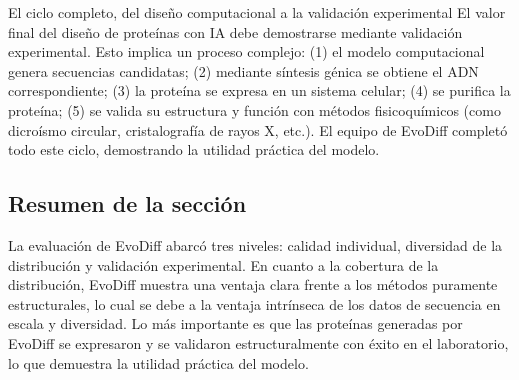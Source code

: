 \begin{knowledgebox}{El ciclo completo, del diseño computacional a la validación experimental}
El valor final del diseño de proteínas con IA debe demostrarse mediante validación experimental. Esto implica un proceso complejo: (1) el modelo computacional genera secuencias candidatas; (2) mediante síntesis génica se obtiene el ADN correspondiente; (3) la proteína se expresa en un sistema celular; (4) se purifica la proteína; (5) se valida su estructura y función con métodos fisicoquímicos (como dicroísmo circular, cristalografía de rayos X, etc.). El equipo de EvoDiff completó todo este ciclo, demostrando la utilidad práctica del modelo.
\end{knowledgebox}

\subsection{Resumen de la sección}

La evaluación de EvoDiff abarcó tres niveles: calidad individual, diversidad de la distribución y validación experimental. En cuanto a la cobertura de la distribución, EvoDiff muestra una ventaja clara frente a los métodos puramente estructurales, lo cual se debe a la ventaja intrínseca de los datos de secuencia en escala y diversidad. Lo más importante es que las proteínas generadas por EvoDiff se expresaron y se validaron estructuralmente con éxito en el laboratorio, lo que demuestra la utilidad práctica del modelo.

